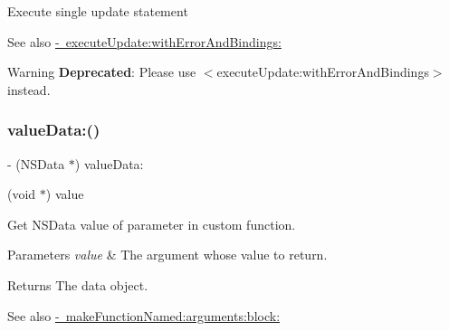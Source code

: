Execute single update statement

\begin{DoxySeeAlso}{See also}
\mbox{\hyperlink{interface_o_p_t_l_y_f_m_d_b_database_a1281526ad6641e7ef2198c3e9d971754}{-\/ execute\+Update\+:with\+Error\+And\+Bindings\+:}}
\end{DoxySeeAlso}
\begin{DoxyWarning}{Warning}
{\bfseries Deprecated}\+: Please use {\ttfamily $<$execute\+Update\+:with\+Error\+And\+Bindings$>$} instead. 
\end{DoxyWarning}
\mbox{\label{interface_o_p_t_l_y_f_m_d_b_database_a8ad2d164fca13ab7f1818c039bda56ec}} 
\subsubsection{\texorpdfstring{value\+Data\+:()}{valueData:()}}
{\footnotesize\ttfamily -\/ (N\+S\+Data $\ast$) value\+Data\+: \begin{DoxyParamCaption}\item[{(void $\ast$)}]{value }\end{DoxyParamCaption}}

Get {\ttfamily N\+S\+Data} value of parameter in custom function.


\begin{DoxyParams}{Parameters}
{\em value} & The argument whose value to return. \\
\hline
\end{DoxyParams}
\begin{DoxyReturn}{Returns}
The data object.
\end{DoxyReturn}
\begin{DoxySeeAlso}{See also}
\mbox{\hyperlink{interface_o_p_t_l_y_f_m_d_b_database_af2c3e10041c8d0a95e2feb84a2ffa645}{-\/ make\+Function\+Named\+:arguments\+:block\+:}} 
\end{DoxySeeAlso}
\mbox{\label{interface_o_p_t_l_y_f_m_d_b_database_aa7c954c5231ffbb5843f9a4893b7761b}} 

